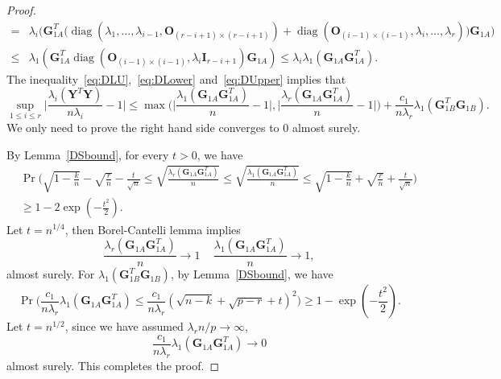 \documentclass[12pt]{article} %
\DeclareMathOperator{\mydiag}{diag}
\newcommand{\bY}{\mathbf{Y}}
\newcommand{\bG}{\mathbf{G}}
\newcommand{\bO}{\mathbf{O}}
\newcommand{\bI}{\mathbf{I}}
\theoremstyle{definition}
\begin{document}
\begin{proof}
\begin{equation}
\begin{aligned}
=&\lambda_i\Big(
\bG_{1A}^T \big(
\mydiag(\lambda_1,\ldots,\lambda_{i-1},\bO_{(r-i+1)\times(r-i+1)})+
\mydiag(\bO_{(i-1)\times(i-1)},\lambda_i,\ldots,\lambda_r)
\big)
\bG_{1A}
\Big)\\
    \leq&
\lambda_1(\bG_{1A}^T \mydiag(\bO_{(i-1)\times(i-1)},\lambda_i \bI_{r-i+1}) \bG_{1A})
\leq  \lambda_i \lambda_1(\bG_{1A}\bG_{1A}^T).
\end{aligned}
\end{equation}
    The inequality~\eqref{eq:DLU},~\eqref{eq:DLower} and~\eqref{eq:DUpper} implies that
    $$
   \sup_{1\leq i \leq r} \Big|\frac{\lambda_i(\bY^T \bY)}{n\lambda_i}-1\Big|\leq
    \max\Big(\Big|\frac{\lambda_1(\bG_{1A}\bG_{1A}^T)}{n}-1\Big|,\Big|\frac{\lambda_r(\bG_{1A}\bG_{1A}^T)}{n}-1\Big|\Big)+\frac{c_1}{n\lambda_r}\lambda_1(\bG_{1B}^T \bG_{1B}).
    $$
    We only need to prove the right hand side converges to $0$ almost surely.

    By Lemma~\ref{DSbound}, for every $t>0$, we have
    $$
    \begin{aligned}
        &\Pr\Big(\sqrt{1-\frac{k}{n}}-\sqrt{\frac{r}{n}}-\frac{t}{\sqrt{n}}\leq \sqrt{\frac{\lambda_r(\bG_{1A}\bG_{1A}^T)}{n}}\leq \sqrt{\frac{\lambda_1(\bG_{1A}\bG_{1A}^T)}{n}}\leq \sqrt{1-\frac{k}{n}}+\sqrt{\frac{r}{n}}+\frac{t}{\sqrt{n}} \Big) \\
        &\geq 1-2\exp(-\frac{t^2}{2}).
    \end{aligned}
    $$
    Let $t=n^{1/4}$, then Borel-Cantelli lemma implies 
    $$
    \frac{\lambda_r(\bG_{1A}\bG_{1A}^T)}{n}\to 1\,\quad
    \frac{\lambda_1(\bG_{1A}\bG_{1A}^T)}{n}\to 1,
    $$
    almost surely.
    For $\lambda_1(\bG_{1B}^T \bG_{1B})$, by Lemma~\ref{DSbound}, we have
    $$
   \Pr\Big( \frac{c_1}{n\lambda_r}{\lambda_1(\bG_{1A}\bG_{1A}^T)}\leq \frac{c_1}{n\lambda_r}(\sqrt{n-k}+\sqrt{p-r}+t)^2 \Big) 
   \geq 1-\exp(-\frac{t^2}{2}).
    $$
Let $t=n^{1/2}$, since we have assumed $\lambda_r n/p\to \infty$, $$\frac{c_1}{n\lambda_r}{\lambda_1(\bG_{1A}\bG_{1A}^T)}\to 0$$
almost surely.
This completes the proof.
\end{proof}
\end{document}
